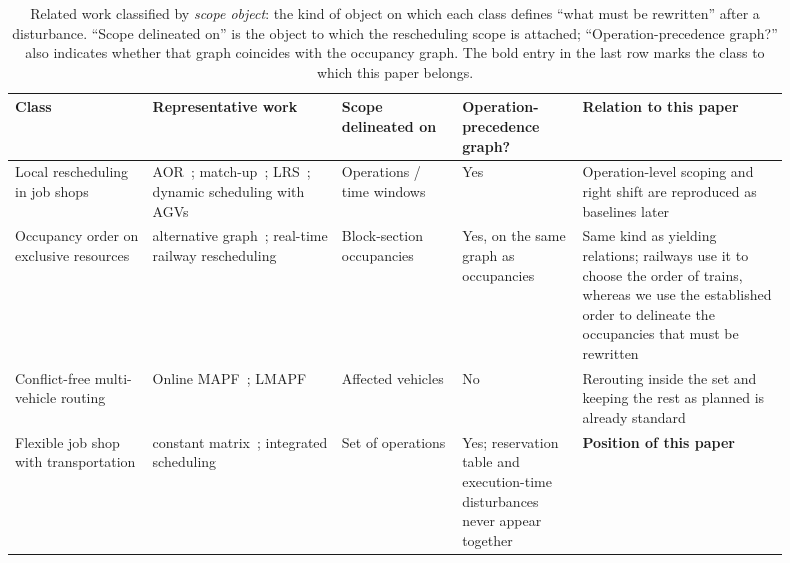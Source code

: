 \begin{table}[t]
\centering
\caption{Related work classified by \emph{scope object}: the kind of object on which each class defines ``what must be rewritten'' after a disturbance.
``Scope delineated on'' is the object to which the rescheduling scope is attached; ``Operation-precedence graph?'' also indicates whether that graph coincides with the occupancy graph.
The bold entry in the last row marks the class to which this paper belongs.}
\label{tab:position}
\small
\begin{tabular}{@{}p{0.16\linewidth}p{0.22\linewidth}p{0.14\linewidth}p{0.14\linewidth}p{0.24\linewidth}@{}}
\toprule
\textbf{Class} & \textbf{Representative work} & \textbf{Scope delineated on} & \textbf{Operation-precedence graph?} & \textbf{Relation to this paper} \\
\midrule
Local rescheduling in job shops &
AOR~\cite{abumaizar1997rescheduling,subramaniam2003maor};
match-up~\cite{akturk1999matchup};
LRS~\cite{kuster2007local};
dynamic scheduling with AGVs~\cite{zhang2023energy,tang2026dynamic} &
Operations / time windows & Yes &
Operation-level scoping and right shift are reproduced as baselines later \\
\addlinespace[2pt]
Occupancy order on exclusive resources &
alternative graph~\cite{mascis2002alternative};
real-time railway rescheduling~\cite{dariano2007branch} &
Block-section occupancies & Yes, on the same graph as occupancies &
Same kind as yielding relations; railways use it to choose the order of trains, whereas we use the established order to delineate the occupancies that must be rewritten \\
\addlinespace[2pt]
Conflict-free multi-vehicle routing &
Online MAPF~\cite{svancara2019online,malka2024online};
LMAPF~\cite{zhang2024guidance} &
Affected vehicles & No &
Rerouting inside the set and keeping the rest as planned is already standard \\
\addlinespace[2pt]
Flexible job shop with transportation &
constant matrix~\cite{xin2025review,meng2025cp,qin2026knowledge,fu2025integrated};
integrated scheduling~\cite{vanos2026exact,sun2023integrated,li2026framework} &
Set of operations & Yes; reservation table and execution-time disturbances never appear together &
\textbf{Position of this paper} \\
\bottomrule
\end{tabular}
\end{table}


